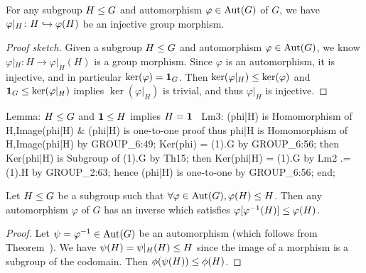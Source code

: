 \begin{lemma}\label{lemma:characteristic:automorphism:restrict-automorphism-gives-monomorphism}
For any subgroup $H\leq G$ and automorphism $\varphi\in\operatorname{Aut}(G)$ of
$G$, we have $\varphi|_{H}\colon H\hookrightarrow\varphi(H)$ be an injective group morphism.
\end{lemma}

\begin{proof}[Proof sketch]
Given a subgroup $H\leq G$ and automorphism $\varphi\in\operatorname{Aut}(G)$, we
know $\varphi|_{H}\colon H\to \varphi|_{H}(H)$ is a group morphism.
Since $\varphi$ is an automorphism, it is injective, and in particular
$\ker(\varphi)=\mathbf{1}_{G}$. Then
$\ker(\varphi|_{H})\leq\ker(\varphi)$ and
$\mathbf{1}_{G}\leq\ker(\varphi|_{H})$ implies
$\ker(\varphi|_H)$ is trivial, and thus $\varphi|_{H}$ is injective.
\end{proof}

\nwenddocs{}\endmoddef\nwstartdeflinemarkup{}\nwenddeflinemarkup
\LA{}Lemma: $H\leq G$ and $\mathbf{1}\leq H$ implies $H=\mathbf{1}$~{\nwtagstyle{}}\RA{}
Lm3:
(phi|H) is Homomorphism of H,Image(phi|H) & (phi|H) is one-to-one
proof
  thus phi|H is Homomorphism of H,Image(phi|H) by GROUP_6:49;
  Ker(phi) = (1).G by GROUP_6:56;
  then Ker(phi|H) is Subgroup of (1).G by Th15;
  then Ker(phi|H) = (1).G by Lm2
                 .= (1).H by GROUP_2:63;
  hence (phi|H) is one-to-one by GROUP_6:56;
end;
\eatline
{}\nwendcode{}\nwdocspar
\begin{theorem}\label{thm:characteristic:automorphism:f-fInv-H-is-subgroup-of-H}
Let $H\leq G$ be a subgroup such that
$\forall\varphi\in\operatorname{Aut}(G),\varphi(H)\leq H$.
Then any automorphism $\varphi$ of $G$ has an inverse which satisfies
$\varphi[\varphi^{-1}(H)]\leq\varphi(H)$.
\end{theorem}

\begin{proof}
Let $\psi=\varphi^{-1}\in\operatorname{Aut}(G)$ be an automorphism (which follows from
Theorem~). We have
$\psi(H)=\psi|_{H}(H)\leq H$ since the image of a morphism is a subgroup of
the codomain. Then $\phi(\psi(H))\leq\phi(H)$.
\end{proof}

